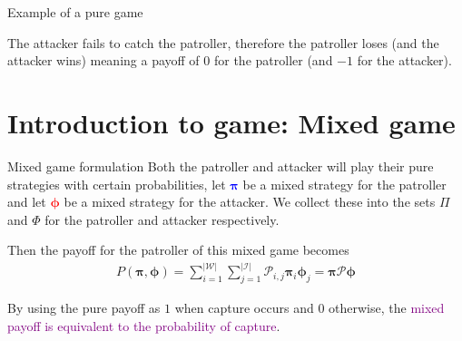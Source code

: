 \documentclass[11pt]{beamer}
\begin{document}
\begin{frame}{Example of a pure game}
\begin{center}

\end{center}
{
The attacker fails to catch the patroller, therefore the patroller loses (and the attacker wins) meaning a payoff of $0$ for the patroller (and $-1$ for the attacker).
}
\end{frame}

\section[]{Introduction to game: Mixed game}
\hypertarget{Introduction to game: Mixed game}{}
\begin{frame}{Mixed game formulation}
Both the patroller and attacker will play their pure strategies with certain probabilities, let \textcolor{blue}{$\bm{\pi}$} be a mixed strategy for the patroller and let \textcolor{red}{$\bm{\phi}$} be a mixed strategy for the attacker. We collect these into the sets $\Pi$ and $\Phi$ for the patroller and attacker respectively.

\pause

Then the payoff for the patroller of this mixed game becomes
\begin{align*}
P(\bm{\pi} ,\bm{\phi})=\sum\limits_{i=1}^{|\mathcal{W}|} \sum\limits_{j=1}^{|\mathcal{I}|} \mathcal{P}_{i,j} \bm{\pi} _{i} \bm{\phi}_{j}
=\bm{\pi} \mathcal{P} \bm{\phi}
\end{align*}

By using the pure payoff as $1$ when capture occurs and $0$ otherwise, the \textcolor{purple}{mixed payoff is equivalent to the probability of capture}.
\end{frame}
\end{document}
